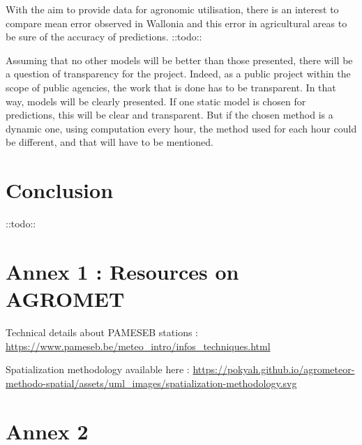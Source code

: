 \documentclass[12pt,twoside]{reedthesis}
\theoremstyle{definition}
\theoremstyle{definition}
\theoremstyle{definition}
\theoremstyle{remark}
\begin{document}
With the aim to provide data for agronomic utilisation, there is an
interest to compare mean error observed in Wallonia and this error in
agricultural areas to be sure of the accuracy of predictions. ::todo::

Assuming that no other models will be better than those presented, there
will be a question of transparency for the project. Indeed, as a public
project within the scope of public agencies, the work that is done has
to be transparent. In that way, models will be clearly presented. If one
static model is chosen for predictions, this will be clear and
transparent. But if the chosen method is a dynamic one, using
computation every hour, the method used for each hour could be
different, and that will have to be mentioned.

\chapter*{Conclusion}\label{conclusion}

::todo::

\appendix

\chapter{Annex 1 : Resources on
AGROMET}\label{annex-1-resources-on-agromet}

Technical details about PAMESEB stations :
\url{https://www.pameseb.be/meteo_intro/infos_techniques.html}

Spatialization methodology available here :
\url{https://pokyah.github.io/agrometeor-methodo-spatial/assets/uml_images/spatialization-methodology.svg}

\chapter{Annex 2}\label{annex-2}
\end{document}
